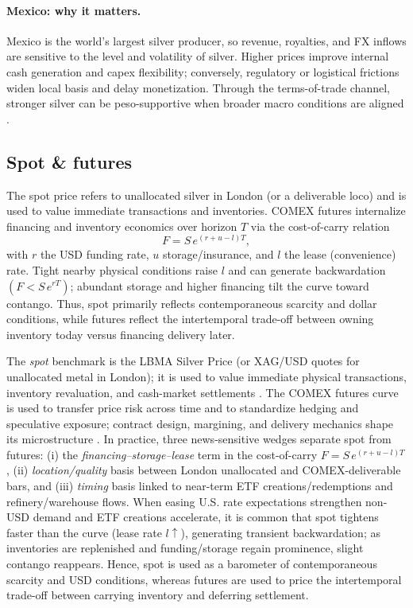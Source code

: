 \documentclass[11pt,a4paper]{article} %
\begin{document}
\paragraph{Mexico: why it matters.}
Mexico is the world’s largest silver producer, so revenue, royalties, and FX inflows are sensitive to the level and volatility of silver. Higher prices improve internal cash generation and capex flexibility; conversely, regulatory or logistical frictions widen local basis and delay monetization. Through the terms-of-trade channel, stronger silver can be peso-supportive when broader macro conditions are aligned \citep{reuters_mx_top_silver}.

\subsection{Spot \& futures}
The spot price refers to unallocated silver in London (or a deliverable loco) and is used to value immediate transactions and inventories. COMEX futures internalize financing and inventory economics over horizon \(T\) via the cost-of-carry relation
\[
F=S\,e^{(r+u-l)T},
\]
with \(r\) the USD funding rate, \(u\) storage/insurance, and \(l\) the lease (convenience) rate. Tight nearby physical conditions raise \(l\) and can generate backwardation \((F<S\,e^{rT})\); abundant storage and higher financing tilt the curve toward contango. Thus, spot primarily reflects contemporaneous scarcity and dollar conditions, while futures reflect the intertemporal trade-off between owning inventory today versus financing delivery later.

The \emph{spot} benchmark is the LBMA Silver Price (or XAG/USD quotes for unallocated metal in London); it is used to value immediate physical transactions, inventory revaluation, and cash-market settlements \citep{lbma_prices}. The COMEX futures curve is used to transfer price risk across time and to standardize hedging and speculative exposure; contract design, margining, and delivery mechanics shape its microstructure \citep{cme_silver_overview}. In practice, three news-sensitive wedges separate spot from futures: (i) the \emph{financing–storage–lease} term in the cost-of-carry \(F=S\,e^{(r+u-l)T}\), (ii) \emph{location/quality} basis between London unallocated and COMEX-deliverable bars, and (iii) \emph{timing} basis linked to near-term ETF creations/redemptions and refinery/warehouse flows. When easing U.S. rate expectations strengthen non-USD demand and ETF creations accelerate, it is common that spot tightens faster than the curve (lease rate \(l\uparrow\)), generating transient backwardation; as inventories are replenished and funding/storage regain prominence, slight contango reappears. Hence, spot is used as a barometer of contemporaneous scarcity and USD conditions, whereas futures are used to price the intertemporal trade-off between carrying inventory and deferring settlement.
\end{document}
